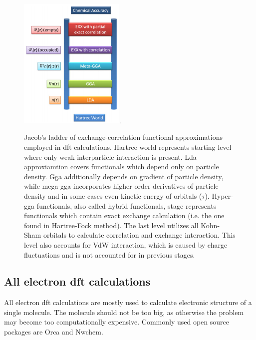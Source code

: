 \documentclass[openany, longbibliography,slovene,a4paper,12pt]{article}
\begin{document}
\begin{figure}
  \centering
  \includegraphics[width=0.45\textwidth]{jacobs_functional_ladder_ver2.png}.
  \caption{Jacob’s ladder of exchange-correlation functional approximations
    employed in dft calculations. Hartree world represents starting level where only
    weak interparticle interaction is present. Lda approxiamtion covers
    functionals which depend only on particle density. Gga additionally depends
    on gradient of particle density, while mega-gga incorporates higher order
    derivatives of particle density and in some cases even kinetic energy of
    orbitals ($\tau$). Hyper-gga functionals, also called hybrid functionals,
    stage represents functionals which contain exact exchange calculation (i.e.
    the one found in Hartree-Fock method). The last level utilizes all Kohn-Sham
    orbitals to calculate correlation and exchange interaction. This level also
    accounts for VdW interaction, which is caused by charge fluctuations and is
    not accounted for in previous stages.
  }
  \label{bijection}
\end{figure}
\subsection{All electron dft calculations}
All electron dft calculations are mostly used to calculate electronic structure of
 a single molecule. The molecule should not be too big, as otherwise the problem
 may become too computationally expensive. Commonly used open source packages
 are Orca and Nwchem.
\end{document}
